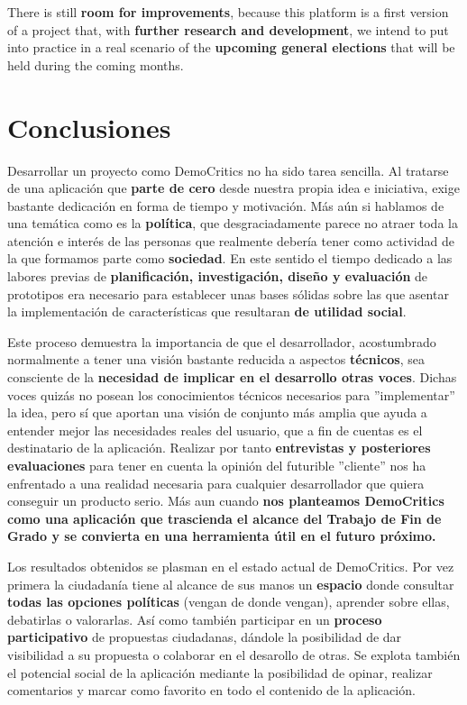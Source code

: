 There is still \textbf{room for improvements}, because this platform is a first version of a project that, with \textbf{further research and development}, we intend to put into practice in a real scenario of the \textbf{upcoming general elections} that will be held during the coming months.


\chapter*{Conclusiones}

Desarrollar un proyecto como DemoCritics no ha sido tarea sencilla. Al tratarse de una aplicación que \textbf{parte de cero} desde nuestra propia idea e iniciativa, exige bastante dedicación en forma de tiempo y motivación. Más aún si hablamos de una temática como es la \textbf{política}, que desgraciadamente parece no atraer toda la atención e interés de las personas que realmente debería tener como actividad de la que formamos parte como \textbf{sociedad}. En este sentido el tiempo dedicado a las labores previas de \textbf{planificación, investigación, diseño y evaluación} de prototipos era necesario para establecer unas bases sólidas sobre las que asentar la implementación de características que resultaran \textbf{de utilidad social}.

Este proceso demuestra la importancia de que el desarrollador, acostumbrado normalmente a tener una visión bastante reducida a aspectos \textbf{técnicos}, sea consciente de la \textbf{necesidad de implicar en el desarrollo otras voces}. Dichas voces quizás no posean los conocimientos técnicos necesarios para ''implementar'' la idea, pero sí que aportan una visión de conjunto más amplia que ayuda a entender mejor las necesidades reales del usuario, que a fin de cuentas es el destinatario de la aplicación. Realizar por tanto \textbf{entrevistas y posteriores evaluaciones} para tener en cuenta la opinión del futurible ''cliente'' nos ha enfrentado a una realidad necesaria para cualquier desarrollador que quiera conseguir un producto serio. Más aun cuando \textbf{nos planteamos DemoCritics como una aplicación que trascienda el alcance del Trabajo de Fin de Grado y se convierta en una herramienta útil en el futuro próximo.}

Los resultados obtenidos se plasman en el estado actual de DemoCritics. Por vez primera la ciudadanía tiene al alcance de sus manos un \textbf{espacio} donde consultar \textbf{todas las opciones políticas} (vengan de donde vengan), aprender sobre ellas, debatirlas o valorarlas. Así como también participar en un \textbf{proceso participativo} de propuestas ciudadanas, dándole la posibilidad de dar visibilidad a su propuesta o colaborar en el desarollo de otras. Se explota también el potencial social de la aplicación mediante la posibilidad de opinar, realizar comentarios y marcar como favorito en todo el contenido de la aplicación.

